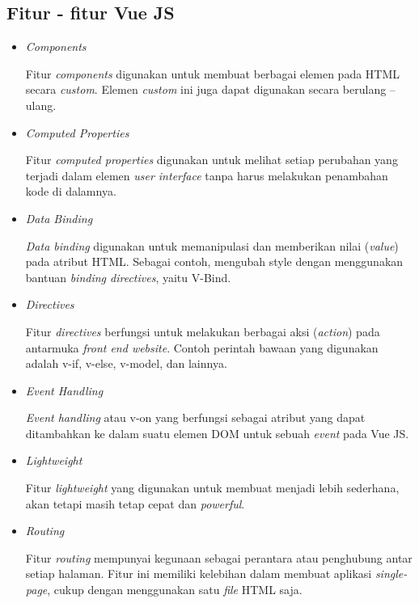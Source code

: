 \subsection{Fitur - fitur Vue JS}
\begin{itemize}
  \item \textit{Components}
  
  Fitur \textit{components} digunakan untuk membuat berbagai elemen pada HTML secara \textit{custom}. Elemen \textit{custom} ini juga dapat digunakan secara berulang – ulang.

  \item \textit{Computed Properties}
  
  Fitur \textit{computed properties} digunakan untuk melihat setiap perubahan yang terjadi dalam elemen \textit{user interface} tanpa harus melakukan penambahan kode di dalamnya.

  \item \textit{Data Binding}
  
  \textit{Data binding} digunakan untuk memanipulasi dan memberikan nilai (\textit{value}) pada atribut HTML. Sebagai contoh, mengubah style dengan menggunakan bantuan \textit{binding directives}, yaitu V-Bind.

  \item \textit{Directives}
  
  Fitur \textit{directives} berfungsi untuk melakukan berbagai aksi (\textit{action}) pada antarmuka \textit{front end website}. Contoh perintah bawaan yang digunakan adalah v-if, v-else, v-model, dan lainnya.

  \item \textit{Event Handling}
  
  \textit{Event handling} atau v-on yang berfungsi sebagai atribut yang dapat ditambahkan ke dalam suatu elemen DOM untuk sebuah \textit{event} pada Vue JS.

  \item \textit{Lightweight}
  
  Fitur \textit{lightweight} yang digunakan untuk membuat menjadi lebih sederhana, akan tetapi masih tetap cepat dan \textit{powerful}.

  \item \textit{Routing}
  
  Fitur \textit{routing} mempunyai kegunaan sebagai perantara atau penghubung antar setiap halaman. Fitur ini memiliki kelebihan dalam membuat aplikasi \textit{single-page}, cukup dengan menggunakan satu \textit{file} HTML saja.


\end{itemize}
